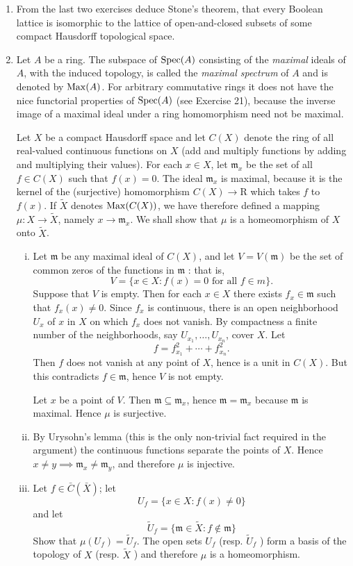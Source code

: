 \documentclass[class=book, crop=false]{standalone}
\theoremstyle{definition}
\theoremstyle{remark}
\begin{document}
\begin{enumerate}[resume*=exc1]
  \item From the last two exercises deduce Stone's theorem, that every Boolean
        lattice is isomorphic to the lattice of open-and-closed subsets of some
        compact Hausdorff topological space.

  \item Let $A$ be a ring. The subspace of $\operatorname{Spec}(A)$ consisting
        of the \textit{maximal} ideals of $A$, with the induced topology, is called the
        \textit{maximal spectrum} of $A$ and is denoted by $\operatorname{Max}(A)$. For
        arbitrary commutative rings it does not have the nice functorial
        properties of $\operatorname{Spec}(A)$ (see Exercise 21), because the inverse image of
        a maximal ideal under a ring homomorphism need not be maximal.

Let $X$ be a compact Hausdorff space and let $C(X)$ denote the ring of all
real-valued continuous functions on $X$ (add and multiply functions by adding
and multiplying their values). For each $x \in X$, let $\mathfrak{m}_{x}$ be the
set of all $f \in C(X)$ such that $f(x)=0$. The ideal $\mathfrak{m}_{x}$ is
maximal, because it is the kernel of the (surjective) homomorphism
$C(X) \to \mathrm{R}$ which takes $f$ to $f(x)$. If $\tilde{X}$ denotes
$\operatorname{Max}(C(X))$, we have therefore defined a mapping
$\mu: X \to \tilde{X}$, namely $x \to \mathfrak{m}_{x}$. We shall show that $\mu$
is a homeomorphism of $X$ onto $\tilde{X}$.
\begin{enumerate}[i)]
  \item Let $\mathfrak{m}$ be any maximal ideal of $C(X)$, and let $V=V(\mathfrak{m})$ be the set of common zeros of the functions in $\mathfrak{m}$ : that is,
\[
  V=\{x \in X: f(x)=0 \text { for all } f \in m\}.
\]
Suppose that $V$ is empty. Then for each $x \in X$ there exists
$f_{x} \in \mathfrak{m}$ such that $f_{x}(x) \neq 0$. Since $f_{x}$ is
continuous, there is an open neighborhood $U_{x}$ of $x$ in $X$ on which $f_{x}$
does not vanish. By compactness a finite number of the neighborhoods, say
$U_{x_{1}}, \ldots, U_{x_{n}}$, cover $X$. Let
\[
  f=f_{x_{1}}^{2}+\cdots+f_{x_{n}}^{2}.
\]
Then $f$ does not vanish at any point of $X$, hence is a unit in $C(X)$. But
this contradicts $f \in \mathfrak{m}$, hence $V$ is not empty.

Let $x$ be a point of $V$. Then $\mathfrak{m} \subseteq \mathfrak{m}_{x}$, hence
$\mathfrak{m}=\mathfrak{m}_{x}$ because $\mathfrak{m}$ is maximal. Hence $\mu$
is surjective.
  \item By Urysohn's lemma (this is the only non-trivial fact required in the
argument) the continuous functions separate the points of $X$. Hence
$x \neq y \implies \mathfrak{m}_{x} \neq \mathfrak{m}_{y}$, and therefore $\mu$ is
injective.
  \item Let $f \in \bar{C}(\bar{X})$; let
\[
  U_{f}=\{x \in X: f(x) \neq 0\}
\]
and let
\[
  \tilde{U}_{f}=\{\mathfrak{m} \in \tilde{X}: f \notin \mathfrak{m}\}
\]
Show that $\mu\left(U_{f}\right)=\tilde{U}_{f}$. The open sets $U_{f}$ (resp.
$\tilde{U}_{f}$ ) form a basis of the topology of $X$ (resp. $\tilde{X}$ ) and
therefore $\mu$ is a homeomorphism.


\end{enumerate}
\end{enumerate}
\end{document}
